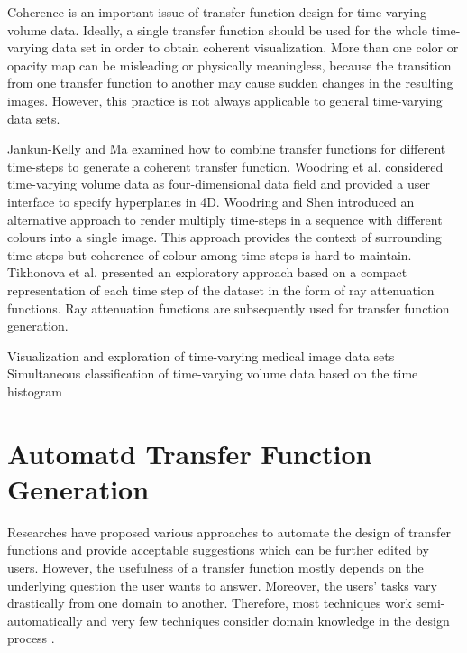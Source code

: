 Coherence is an important issue of transfer function design for time-varying volume data. Ideally, a single transfer function should be used for the whole time-varying data set in order to obtain coherent visualization. More than one color or opacity map can be misleading or physically meaningless, because the transition from one transfer function to another may cause sudden changes in the resulting images. However, this practice is not always applicable to general time-varying data sets.

Jankun-Kelly and Ma \cite{jankun-kelly_study_2001} examined how to combine transfer functions for different time-steps to generate a coherent transfer function.
Woodring et al. \cite{woodring_high_2003} considered time-varying volume data as four-dimensional data field and provided a user interface to specify hyperplanes in 4D.
Woodring and Shen \cite{woodring_chronovolumes_2003} introduced an alternative approach to render multiply time-steps in a sequence with different colours into a single image. This approach provides the context of surrounding time steps but coherence of colour among time-steps is hard to maintain.
Tikhonova et al. \cite{tikhonova_exploratory_2010} presented an exploratory approach based on a compact representation of each time step of the dataset in the form of ray attenuation functions. Ray attenuation functions are subsequently used for transfer function generation.



Visualization and exploration of time-varying medical image data sets
\cite{fang_visualization_2007}
Simultaneous classification of time-varying volume data based on the time histogram
\cite{akiba_simultaneous_2006}

\section{Automatd Transfer Function Generation}
Researches have proposed various approaches to automate the design of transfer functions and provide acceptable suggestions which can be further edited by users. However, the usefulness of a transfer function mostly depends on the underlying question the user wants to answer. Moreover, the users' tasks vary drastically from one domain to another. Therefore, most techniques work semi-automatically and very few techniques consider domain knowledge in the design process \cite{zudilova-seinstra_trends_2008}.

